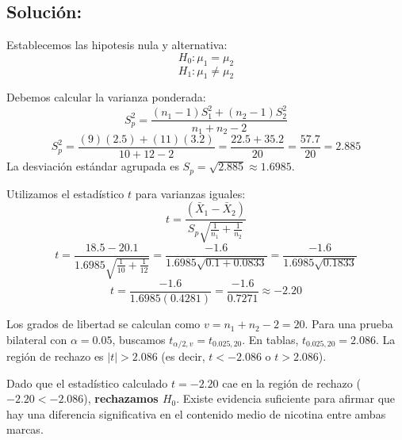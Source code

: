 \documentclass[paper=letter, fontsize=11pt, draft=false]{scrartcl}\usepackage[]{graphicx}\usepackage[]{xcolor}
\numberwithin{equation}{problemcounter} %
\numberwithin{figure}{problemcounter} %
\numberwithin{table}{problemcounter} %
\numberwithin{subsection}{problemcounter}
\begin{document}
\subsection{\textbf{Solución:}}

Establecemos las hipotesis nula y alternativa:
$$H_0: \mu_1 = \mu_2$$
$$H_1: \mu_1 \neq \mu_2$$


Debemos calcular la varianza ponderada:
$$S_p^2 = \frac{(n_1 - 1)S_1^2 + (n_2 - 1)S_2^2}{n_1 + n_2 - 2}$$
$$S_p^2 = \frac{(9)(2.5) + (11)(3.2)}{10 + 12 - 2} = \frac{22.5 + 35.2}{20} = \frac{57.7}{20} = 2.885$$
La desviación estándar agrupada es $S_p = \sqrt{2.885} \approx 1.6985$.


Utilizamos el estadístico $t$ para varianzas iguales:
$$t = \frac{(\bar{X}_1 - \bar{X}_2)}{S_p \sqrt{\frac{1}{n_1} + \frac{1}{n_2}}}$$
$$t = \frac{18.5 - 20.1}{1.6985 \sqrt{\frac{1}{10} + \frac{1}{12}}} = \frac{-1.6}{1.6985 \sqrt{0.1 + 0.0833}} = \frac{-1.6}{1.6985 \sqrt{0.1833}}$$
$$t = \frac{-1.6}{1.6985 (0.4281)} = \frac{-1.6}{0.7271} \approx -2.20$$


Los grados de libertad se calculan como $v = n_1 + n_2 - 2 = 20$.
Para una prueba bilateral con $\alpha = 0.05$, buscamos $t_{\alpha/2, v} = t_{0.025, 20}$.
En tablas, $t_{0.025, 20} = 2.086$.
La región de rechazo es $|t| > 2.086$ (es decir, $t < -2.086$ o $t > 2.086$).

Dado que el estadístico calculado $t = -2.20$ cae en la región de rechazo ($ -2.20 < -2.086$), \textbf{rechazamos $H_0$}. Existe evidencia suficiente para afirmar que hay una diferencia significativa en el contenido medio de nicotina entre ambas marcas.

\newpage


\end{document}
